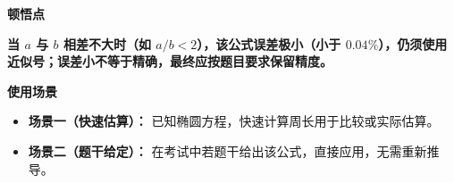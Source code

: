 \begin{explanationbox}
	\medskip

	\textbf{\textcolor{CExplanation}{顿悟点}}

	\textbf{当 $a$ 与 $b$ 相差不大时（如 $a/b<2$），该公式误差极小（小于 $0.04\%$），仍须使用近似号；误差小不等于精确，最终应按题目要求保留精度。}

	\medskip

	\textbf{\textcolor{CExplanation}{使用场景}}

	\begin{itemize}[leftmargin=*, itemsep=0.5em, topsep=0.4em]
		\item \textbf{场景一（快速估算）：} 已知椭圆方程，快速计算周长用于比较或实际估算。
		\item \textbf{场景二（题干给定）：} 在考试中若题干给出该公式，直接应用，无需重新推导。
	\end{itemize}
\end{explanationbox}